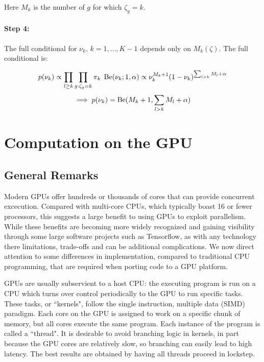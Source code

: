     Here $M_k$ is the number of $g$ for which $\zeta_g = k$. 
\paragraph{Step 4:} The full conditional for $\nu_k,\,k=1,\ldots,K-1$ depends only on $M_k(\zeta)$. The full conditional is:

  \begin{equation}
    p(\nu_k) \propto \prod_{l \ge k} \prod_{g:\zeta_g=k} \pi_k \; \operatorname{Be}(\nu_k; 1, \alpha) \propto \nu_k^{M_k + 1}(1-\nu_k)^{\sum_{l > k} M_l + \alpha} 
  \end{equation}
  \begin{equation*}
    \implies p(\nu_k)=\operatorname{Be}(M_k + 1, \sum_{l>k}M_l + \alpha)
  \end{equation*}

\section{Computation on the GPU}
\label{sec:parallel}
\subsection{General Remarks}
Modern GPUs offer hundreds or thousands of cores that can provide concurrent excecution. Compared with multi-core CPUs, which typically boast 16 or fewer processors, this suggests a large benefit to using GPUs to exploit parallelism. While these benefits are becoming more widely recognized and gaining visibility through some large software projects such as Tensorflow, as with any technology there limitations, trade-offs and can be additional complications. We now direct attention to some differences in implementation, compared to traditional CPU programming, that are required when porting code to a GPU platform.

GPUs are usually subservient to a host CPU: the executing program is run on a CPU which turns over control periodically to the GPU to run specific tasks. These tasks, or ``kernels", follow the single instruction, multiple data (SIMD) paradigm. Each core on the GPU is assigned to work on a specific chunk of memory, but all cores execute the same program. Each instance of the program is called a ``thread". It is desirable to avoid branching logic in kernels, in part because the GPU cores are relatively slow, so branching can easily lead to high latency. The best results are obtained by having all threads proceed in lockstep.

